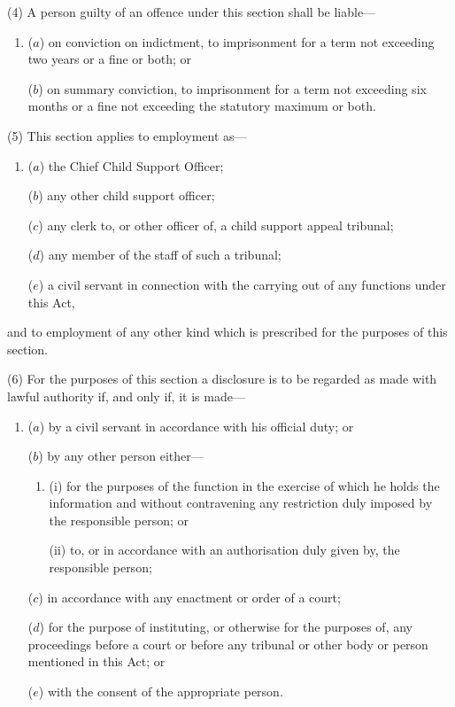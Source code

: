 \documentclass[12pt,a4paper]{article}
\begin{document}
(4) A person guilty of an offence under this section shall be liable—
\begin{enumerate}\item[]
($a$) on conviction on indictment, to imprisonment for a term not exceeding two years or a fine or both; or

($b$) on summary conviction, to imprisonment for a term not exceeding six months or a fine not exceeding the statutory maximum or both.
\end{enumerate}

(5) This section applies to employment as—
\begin{enumerate}\item[]
($a$) the Chief Child Support Officer;

($b$) any other child support officer;

($c$) any clerk to, or other officer of, 
a child support appeal tribunal;

($d$) any member of the staff of such a tribunal;

($e$) a civil servant in connection with the carrying out of any functions under this Act,
\end{enumerate}
and to employment of any other kind which is prescribed for the purposes of this section.

(6) For the purposes of this section a disclosure is to be regarded as made with lawful authority if, and only if, it is made—
\begin{enumerate}\item[]
($a$) by a civil servant in accordance with his official duty; or

($b$) by any other person either—
\begin{enumerate}\item[]
(i) for the purposes of the function in the exercise of which he holds the information and without contravening any restriction duly imposed by the responsible person; or

(ii) to, or in accordance with an authorisation duly given by, the responsible person;
\end{enumerate}

($c$) in accordance with any enactment or order of a court;

($d$) for the purpose of instituting, or otherwise for the purposes of, any proceedings before a court or before any tribunal or other body or person mentioned in this Act; or

($e$) with the consent of the appropriate person.
\end{enumerate}
\end{document}

